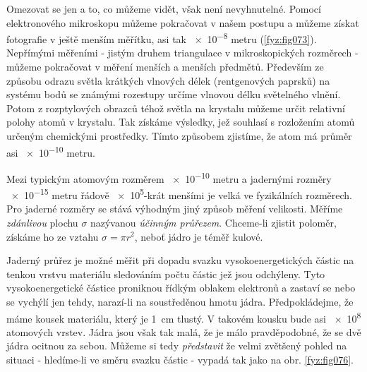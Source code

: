 {    Omezovat se jen a to, co můžeme vidět, však není  nevyhnutelné. Pomocí elektronového mikroskopu 
    můžeme pokračovat v našem postupu a můžeme získat fotografie v ještě menším měřítku, asi tak 
    \num{e-8} metru  (\ref{fyz:fig073}). Nepřímými měřeními - jistým druhem triangulace v 
    mikroskopických rozměrech - můžeme pokračovat v měření menších a menších předmětů. Především ze 
    způsobu odrazu světla krátkých vlnových délek (rentgenových paprsků) na systému bodů se známými 
    rozestupy určíme vlnovou délku světelného vlnění. Potom z rozptylových obrazců téhož světla na 
    krystalu můžeme určit relativní polohy atomů v krystalu. Tak získáme výsledky, jež souhlasí s 
    rozložením atomů určeným chemickými prostředky. Tímto způsobem zjistíme, že atom má průměr asi 
    \num{e-10} metru. 

    Mezi typickým atomovým rozměrem \num{e-10} metru a jadernými rozměry \num{e-15} metru řádově 
    \num{e5}-krát menšími je velká  ve fyzikálních rozměrech. Pro jaderné rozměry se 
    stává výhodným jiný způsob měření velikosti. Měříme \emph{zdánlivou} plochu \(\sigma\) 
    nazývanou \emph{účinným průřezem}. Chceme-li zjistit poloměr, získáme ho ze vztahu \(\sigma = 
    \pi r^2\), neboť jádro je téměř kulové. 

    Jaderný průřez je možné měřit při dopadu svazku vysokoenergetických částic na tenkou vrstvu 
    materiálu sledováním počtu částic jež jsou odchýleny. Tyto vysokoenergetické částice  proniknou 
    řídkým oblakem elektronů a zastaví se nebo se vychýlí jen tehdy, narazí-li na soustředěnou 
    hmotu jádra. Předpokládejme, že máme kousek materiálu, který je \SI{1}{\cm} tlustý. V takovém 
    kousku bude asi \num{e8} atomových vrstev. Jádra jsou však tak malá, že je málo pravděpodobné, 
    že se dvě jádra ocitnou za sebou. Můžeme si tedy \emph{představit} že velmi zvětšený pohled na 
    situaci - hledíme-li ve směru svazku částic - vypadá tak jako na obr. \ref{fyz:fig076}. 

}
